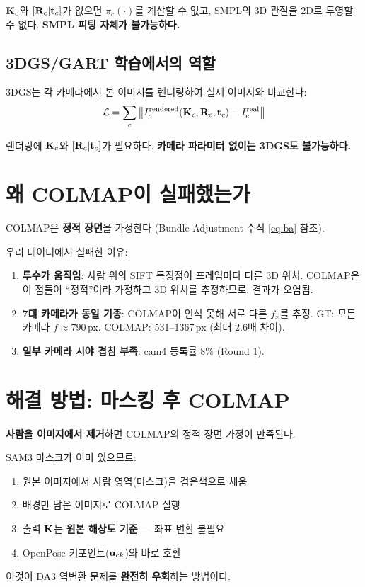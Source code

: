 \documentclass[11pt, a4paper]{report}
\theoremstyle{definition}
\theoremstyle{remark}
\begin{document}
$\mathbf{K}_c$와 $[\mathbf{R}_c|\mathbf{t}_c]$가 없으면 $\pi_c(\cdot)$를 계산할 수 없고,
SMPL의 3D 관절을 2D로 투영할 수 없다.
\textbf{SMPL 피팅 자체가 불가능하다.}


\subsection{3DGS/GART 학습에서의 역할}

3DGS는 각 카메라에서 본 이미지를 렌더링하여 실제 이미지와 비교한다:
\begin{equation}
\mathcal{L} = \sum_c \left\| I_c^{\text{rendered}}(\mathbf{K}_c, \mathbf{R}_c, \mathbf{t}_c) - I_c^{\text{real}} \right\|
\end{equation}

렌더링에 $\mathbf{K}_c$와 $[\mathbf{R}_c|\mathbf{t}_c]$가 필요하다.
\textbf{카메라 파라미터 없이는 3DGS도 불가능하다.}


\section{왜 COLMAP이 실패했는가}

\begin{warningbox}
COLMAP은 \textbf{정적 장면}을 가정한다 (Bundle Adjustment 수식 \cref{eq:ba} 참조).

우리 데이터에서 실패한 이유:
\begin{enumerate}[nosep]
  \item \textbf{투수가 움직임}: 사람 위의 SIFT 특징점이 프레임마다 다른 3D 위치.
  COLMAP은 이 점들이 ``정적''이라 가정하고 3D 위치를 추정하므로, 결과가 오염됨.

  \item \textbf{7대 카메라가 동일 기종}: COLMAP이 인식 못해 서로 다른 $f_x$를 추정.
  GT: 모든 카메라 $f \approx 790$\,px. COLMAP: 531--1367\,px (최대 2.6배 차이).

  \item \textbf{일부 카메라 시야 겹침 부족}: cam4 등록률 8\% (Round 1).
\end{enumerate}
\end{warningbox}


\section{해결 방법: 마스킹 후 COLMAP}

\begin{keyidea}
\textbf{사람을 이미지에서 제거}하면 COLMAP의 정적 장면 가정이 만족된다.

SAM3 마스크가 이미 있으므로:
\begin{enumerate}[nosep]
  \item 원본 이미지에서 사람 영역(마스크)을 검은색으로 채움
  \item 배경만 남은 이미지로 COLMAP 실행
  \item 출력 $\mathbf{K}$는 \textbf{원본 해상도 기준} --- 좌표 변환 불필요
  \item OpenPose 키포인트($\mathbf{u}_{ck}$)와 바로 호환
\end{enumerate}

이것이 DA3 역변환 문제를 \textbf{완전히 우회}하는 방법이다.
\end{keyidea}
\end{document}
